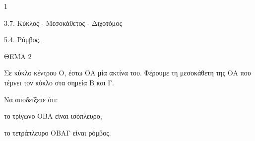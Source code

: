 \begin{ylh}{1}
    \item 3.7. Κύκλος - Μεσοκάθετος - Διχοτόμος
    \item 5.4. Ρόμβος.
\end{ylh}

ΘΕΜΑ 2

Σε κύκλο κέντρου Ο, έστω ΟΑ μία ακτίνα του. Φέρουμε τη μεσοκάθετη της ΟΑ που τέμνει τον κύκλο στα σημεία Β και Γ.

Να αποδείξετε ότι:

\begin{alist}
\item το τρίγωνο ΟΒΑ είναι ισόπλευρο, 

\item το τετράπλευρο ΟΒΑΓ είναι ρόμβος. 
\end{alist}

